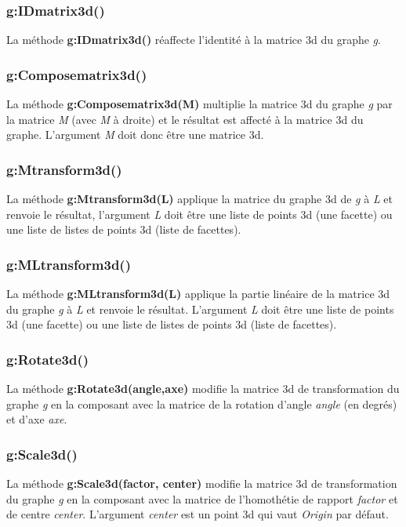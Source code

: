 \documentclass[%
10pt,%
a4paper,%
french,%
]%
{article}%
\begin{document}
\subsubsection{g:IDmatrix3d()}
La méthode \textbf{g:IDmatrix3d()} réaffecte l'identité à la matrice 3d du graphe \emph g.

\subsubsection{g:Composematrix3d()}
La méthode \textbf{g:Composematrix3d(M)} multiplie la matrice 3d du graphe \emph g par la matrice \emph{M} (avec \emph{M} à droite) et le résultat est affecté à la matrice 3d du graphe. L'argument \emph{M} doit donc être une matrice 3d.

\subsubsection{g:Mtransform3d()}
La méthode \textbf{g:Mtransform3d(L)} applique la matrice du graphe 3d de \emph g à \emph{L} et renvoie le résultat, l'argument \emph L doit être une liste de points 3d (une facette) ou une liste de listes de points 3d (liste de facettes).

\subsubsection{g:MLtransform3d()}
La méthode \textbf{g:MLtransform3d(L)} applique la partie linéaire de la matrice 3d du graphe \emph g à \emph{L} et renvoie le résultat. L'argument \emph L doit être une liste de points 3d (une facette) ou une liste de listes de points 3d (liste de facettes).

\subsubsection{g:Rotate3d()}
La méthode \textbf{g:Rotate3d(angle,axe)} modifie la matrice 3d de transformation du graphe \emph g en la composant avec la matrice de la rotation d'angle \emph{angle} (en degrés) et d'axe \emph{axe}. 

\subsubsection{g:Scale3d()}
La méthode \textbf{g:Scale3d(factor, center)} modifie la matrice 3d de transformation du graphe \emph g en la composant avec la matrice de l'homothétie de rapport \emph{factor} et de centre \emph{center}. L'argument \emph{center} est un point 3d qui vaut \emph{Origin} par défaut.
\end{document}
